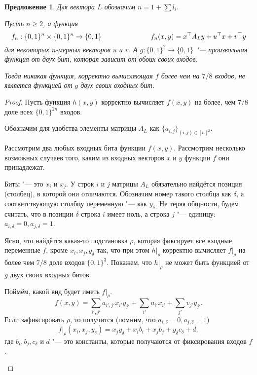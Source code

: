 \documentclass[oneside, a4paper]{article}
\newtheorem{proposition}{Предложение}
\theoremstyle{definition}
\theoremstyle{remark}
\begin{document}
\begin{proposition} \label{tough}
Для вектора $L$ обозначим $n = 1 + \sum l_i$.

Пусть $n \geq 2$, а функция
\[
f_n : \{0, 1\}^n \times \{0, 1\}^n \to \{0, 1\} \hspace{2.5cm}
f_n(x, y) = x^\top A_L y + u^\top x + v^\top y
\]
для некоторых $n$-мерных векторов $u$ и $v$. А $g : \{0, 1\}^2 \to \{0, 1\}$
"--- произвольная функция от двух бит, которая зависит от обоих своих входов.

Тогда никакая функция, корректно вычисляющая $f$ более чем на $7/8$ входов, не
является функцией от $g$ двух своих входных бит.
\end{proposition}

\begin{proof}
Пусть функция $h(x, y)$ корректно вычисляет $f(x, y)$ на более, чем $7/8$ доле
всех $\{0, 1\}^{2n}$ входов.

Обозначим для удобства элементы матрицы $A_L$ как $\{a_{i, j}\}_{(i, j) \in {[n]^2}}$.

Рассмотрим два любых входных бита функции $f(x, y)$. Рассмотрим несколько
возможных случаев того, каким из входных векторов $x$ и $y$ функции $f$ они
принадлежат.
\begin{description}
\item{Биты "--- это $x_i$ и $x_j$.} У строк $i$ и $j$ матрицы $A_L$ обязательно
найдётся позиция (столбец), в которой они отличаются. Обозначим номер такого
столбца как $\delta$, а соответствующую столбцу переменную "--- как $y_\delta$.
Не теряя общности, будем считать, что в позиции $\delta$ строка $i$ имеет ноль,
а строка $j$ "--- единицу: $a_{i, \delta} = 0, a_{j, \delta} = 1$.

Ясно, что найдётся какая-то подстановка $\rho$, которая фиксирует все входные
переменные $f$, кроме $x_i, x_j, y_\delta$ так, что при этом $h \rvert _ \rho$
корректно вычисляет $f \rvert _ \rho$ на более чем $7/8$ доле входов $\{0,
1\}^3$. Покажем, что $h \rvert _ \rho$ не может быть функцией от $g$ двух своих
входных битов.

Поймём, какой вид будет иметь $f \rvert _ \rho$. 
\[
f(x, y) = \sum_{i', j'} a_{i', j'} x_{i'} y_{j'} + \sum_{i'} u_{i'} x_{i'} + \sum_{j'} v_{j'} y_{j'}.
\]
Если зафиксировать $\rho$, то получится (помним, что $a_{i, \delta} = 0, a_{j, \delta} = 1$)
\[
f \rvert _ \rho (x_i, x_j, y_\delta) = x_j y_\delta + x_i b_i + x_j b_j + y_\delta c_\delta + d,
\]
где $b_i, b_j, c_\delta$ и $d$ "--- это константы, которые получаются от
фиксирования входов $f$.


\end{description}
\end{proof}
\end{document}
